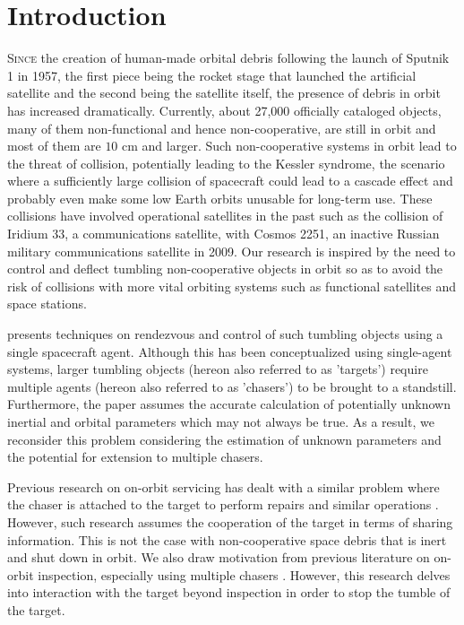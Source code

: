\section{Introduction}
\lettrine{S}{ince} the creation of human-made orbital debris following the launch of Sputnik 1 in 1957, the first piece being the rocket stage that launched the artificial satellite and the second being the satellite itself, the presence of debris in orbit has increased dramatically.
Currently, about 27,000 officially cataloged objects, many of them non-functional and hence non-cooperative, are still in orbit and most of them are $10$ cm and larger. %
Such non-cooperative systems in orbit lead to the threat of collision, potentially leading to the Kessler syndrome, the scenario where a sufficiently large collision of spacecraft could lead to a cascade effect and probably even make some low Earth orbits unusable for long-term use.
These collisions have involved operational satellites in the past such as the collision of Iridium 33, a communications satellite, with Cosmos 2251, an inactive Russian military communications satellite in 2009.
Our research is inspired by the need to control and deflect tumbling non-cooperative objects in orbit so as to avoid the risk of collisions with more vital orbiting systems such as functional satellites and space stations.

\cite{albee2021robust} presents techniques on rendezvous and control of such tumbling objects using a single spacecraft agent.
Although this has been conceptualized using single-agent systems, larger tumbling objects (hereon also referred to as 'targets') require multiple agents (hereon also referred to as 'chasers') to be brought to a standstill.
Furthermore, the paper assumes the accurate calculation of potentially unknown inertial and orbital parameters which may not always be true.
As a result, we reconsider this problem considering the estimation of unknown parameters and the potential for extension to multiple chasers.

Previous research on on-orbit servicing has dealt with a similar problem where the chaser is attached to the target to perform repairs and similar operations \cite{nakka2022information,battistini2022iterative}.
However, such research assumes the cooperation of the target in terms of sharing information.
This is not the case with non-cooperative space debris that is inert and shut down in orbit.
We also draw motivation from previous literature on on-orbit inspection, especially using multiple chasers \cite{long2007orbit}.
However, this research delves into interaction with the target beyond inspection in order to stop the tumble of the target.

